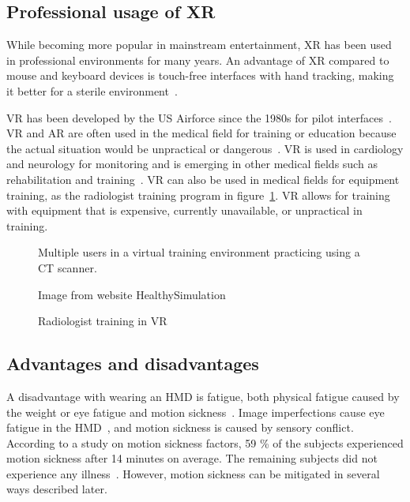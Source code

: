 \documentclass[a4paper]{report}
\begin{document}
\subsection{Professional usage of XR}
While becoming more popular in mainstream entertainment, XR has been used in professional environments for many years.
An advantage of XR compared to mouse and keyboard devices is touch-free interfaces with hand tracking, making it better for a sterile environment~\cite{andrews_extended_2019}.

VR has been developed by the US Airforce since the 1980s for pilot interfaces~\cite{mertz_virtual_2019}. VR and AR are often used in the medical field for training or education because the actual situation would be unpractical or dangerous~\cite{freina_immersive_2015}.
VR is used in cardiology and neurology for monitoring and is emerging in other medical fields such as rehabilitation and training~\cite{javaid_virtual_2020}.
VR can also be used in medical fields for equipment training, as the radiologist training program in figure~\ref{training}. VR allows for training with equipment that is expensive, currently unavailable, or unpractical in training.

\begin{figure}[h!]
    \centering
	\hfill
  \caption{Radiologist training in VR}
  \label{training}
  \small
Multiple users in a virtual training environment practicing using a CT scanner.

Image from website HealthySimulation~\cite{noauthor_how_2020}
\end{figure}

\subsection{Advantages and disadvantages}
A disadvantage with wearing an HMD is fatigue, both physical fatigue caused by the weight or eye fatigue and motion sickness~\cite{merhi_motion_2007}.
Image imperfections cause eye fatigue in the HMD~\cite{kooi_visual_2004}, and motion sickness is caused by sensory conflict.
According to a study on motion sickness factors, 59 \% of the subjects experienced motion sickness after 14 minutes on average. The remaining subjects did not experience any illness~\cite{kooi_visual_2004}. However, motion sickness can be mitigated in several ways described later.
\end{document}
